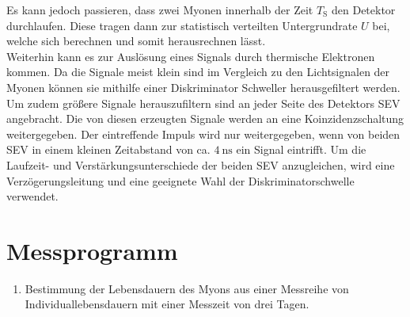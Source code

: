 Es kann jedoch passieren, dass zwei Myonen innerhalb der Zeit $T_\text{S}$ den Detektor durchlaufen.
Diese tragen dann zur statistisch verteilten Untergrundrate $U$ bei, welche sich berechnen und somit herausrechnen lässt. \\

Weiterhin kann es zur Auslösung eines Signals durch thermische Elektronen kommen.
Da die Signale meist klein sind im Vergleich zu den Lichtsignalen der Myonen können sie mithilfe einer Diskriminator Schweller herausgefiltert werden.
Um zudem größere Signale herauszufiltern sind an jeder Seite des Detektors SEV angebracht.
Die von diesen erzeugten Signale werden an eine Koinzidenzschaltung weitergegeben.
Der eintreffende Impuls wird nur weitergegeben, wenn von beiden SEV in einem kleinen Zeitabstand von ca. $\SI{4}{\nano\second}$ ein Signal eintrifft.
Um die Laufzeit- und Verstärkungsunterschiede der beiden SEV anzugleichen, wird eine Verzögerungsleitung und eine geeignete Wahl der Diskriminatorschwelle verwendet.
\FloatBarrier
\section{Messprogramm} %
\label{sec:messprogramm}

\begin{enumerate}
	\item Bestimmung der Lebensdauern des Myons aus einer Messreihe von Individuallebensdauern mit einer Messzeit von drei Tagen.
\end{enumerate}